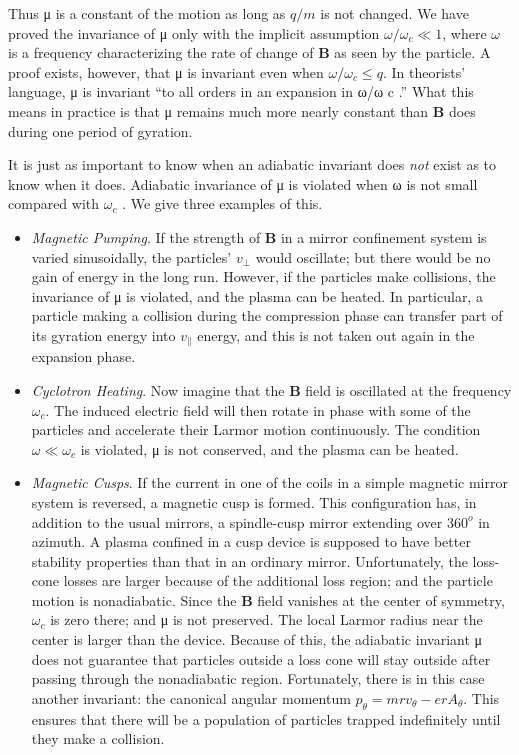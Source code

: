\documentclass[
  notoc %
]{tufte-book}
\begin{document}
Thus μ is a constant of the motion as long as \(q/m\) is not changed. We
have proved the invariance of μ only with the implicit assumption
\(\omega/\omega_c \ll 1\), where \(\omega\) is a frequency
characterizing the rate of change of \(\mathbf{B}\) as seen by the
particle. A proof exists, however, that μ is invariant even when
\(\omega/\omega_c \le q\). In theorists' language, μ is invariant ``to
all orders in an expansion in ω/ω c .'' What this means in practice is
that μ remains much more nearly constant than \(\mathbf{B}\) does during
one period of gyration.

It is just as important to know when an adiabatic invariant does
\emph{not} exist as to know when it does. Adiabatic invariance of μ is
violated when ω is not small compared with \(\omega_c\) . We give three
examples of this.

\begin{itemize}
\item
  \emph{Magnetic Pumping}. If the strength of \(\mathbf{B}\) in a mirror
  confinement system is varied sinusoidally, the particles' \(v_\perp\)
  would oscillate; but there would be no gain of energy in the long run.
  However, if the particles make collisions, the invariance of μ is
  violated, and the plasma can be heated. In particular, a particle
  making a collision during the compression phase can transfer part of
  its gyration energy into \(v_\parallel\) energy, and this is not taken
  out again in the expansion phase.
\item
  \emph{Cyclotron Heating}. Now imagine that the \(\mathbf{B}\) field is
  oscillated at the frequency \(\omega_c\). The induced electric field
  will then rotate in phase with some of the particles and accelerate
  their Larmor motion continuously. The condition \(\omega\ll \omega_c\)
  is violated, μ is not conserved, and the plasma can be heated.
\item
  \emph{Magnetic Cusps}. If the current in one of the coils in a simple
  magnetic mirror system is reversed, a magnetic cusp is formed. This
  configuration has, in addition to the usual mirrors, a spindle-cusp
  mirror extending over \(360^o\) in azimuth. A plasma confined in a
  cusp device is supposed to have better stability properties than that
  in an ordinary mirror. Unfortunately, the loss-cone losses are larger
  because of the additional loss region; and the particle motion is
  nonadiabatic. Since the \(\mathbf{B}\) field vanishes at the center of
  symmetry, \(\omega_c\) is zero there; and μ is not preserved. The
  local Larmor radius near the center is larger than the device. Because
  of this, the adiabatic invariant μ does not guarantee that particles
  outside a loss cone will stay outside after passing through the
  nonadiabatic region. Fortunately, there is in this case another
  invariant: the canonical angular momentum
  \(p_\theta = mrv_\theta - erA_\theta\). This ensures that there will
  be a population of particles trapped indefinitely until they make a
  collision.
\end{itemize}
\end{document}
